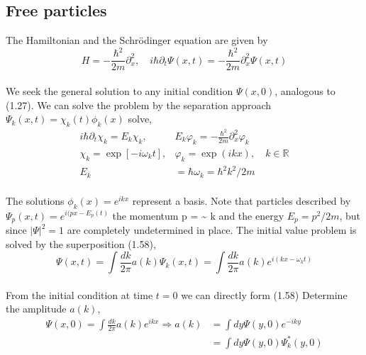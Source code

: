 \subsection{Free particles}
The Hamiltonian and the Schrödinger equation are given by
\\
\begin{equation}
H=-\frac{\hbar^{2}}{2 m} \partial_{x}^{2}, \quad i \hbar \partial_{t} \Psi(x, t)=-\frac{\hbar^{2}}{2 m} \partial_{x}^{2} \Psi(x, t)
\end{equation}
\\
We seek the general solution to any initial condition
$\Psi(x,0)$, analogous to (1.27). We can solve the problem by the separation approach
$\Psi_k(x,t)=\chi_k(t)\phi_k(x)$ solve,
\\
\begin{equation}
\begin{aligned} 
i \hbar \partial_{t} \chi_{k}=E_{k} \chi_{k}, & E_{k} \varphi_{k}=-\frac{\hbar^{2}}{2 m} \partial_{x}^{2} \varphi_{k} \\ \chi_{k}=\exp \left[-i \omega_{k} t\right], & \varphi_{k}=\exp (i k x), \quad k \in \mathbb{R} \\ E_{k} &=\hbar \omega_{k}=\hbar^{2} k^{2} / 2 m \end{aligned}
\end{equation}\\
The solutions $\phi_k(x)=e^{ikx}$ represent a basis. Note that particles
described by $\Psi_p(x,t)=e^{i(px-E_p(t)}$ the momentum p = \~{} k and the energy
$E_p=p^2/2m$, but since $|\Psi|^2=1$ are completely undetermined in place.
The initial value problem is solved by the superposition (1.58),
\\
\begin{equation}
\Psi(x, t)=\int \frac{d k}{2 \pi} a(k) \Psi_{k}(x, t)=\int \frac{d k}{2 \pi} a(k) e^{i\left(k x-\omega_{k} t\right)}
\end{equation}\\
From the initial condition at time $t = 0$ we can directly form (1.58)
Determine the amplitude $a (k)$,
\\
\begin{equation}
\begin{aligned} \Psi(x, 0)=\int \frac{d k}{2 \pi} a(k) e^{i k x} \Rightarrow a(k) &=\int d y \Psi(y, 0) e^{-i k y} \\ &=\int d y \Psi(y, 0) \Psi_{k}^{*}(y, 0) \end{aligned}
\end{equation}\\
